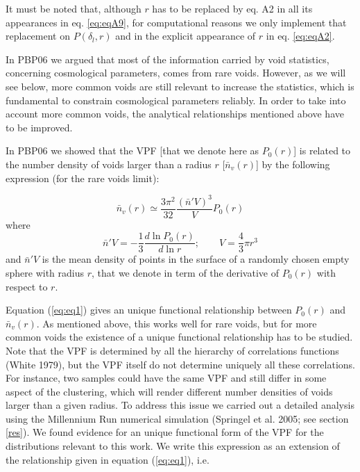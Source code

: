   
It must be noted that, although $r$ has to be replaced by eq. A2 in all its appearances in eq. \ref{eq:eqA9}, for computational reasons we only implement 
that replacement on $P(\delta_l,r)$ and in the explicit appearance of $r$ in eq. \ref{eq:eqA2}.

In PBP06 we argued that most of the information carried by void statistics, concerning cosmological parameters, comes from rare voids.
However, as we will see below, more common voids are still relevant to increase the statistics, which is fundamental to constrain cosmological parameters reliably. 
In order to take into account more common voids, the analytical relationships mentioned above have to be improved.

In PBP06 we showed that the VPF [that we denote here as $P_{0}(r)$] is related to the number density of voids larger 
than a radius $r$ [$\bar{n}_{v}(r)$] by the following expression (for the rare voids limit):

\begin{equation}
\bar{n}_{v}(r) \simeq \frac{3\pi^2}{32}\frac{(\bar{n}'V)^3}{V}P_{0}(r) \label{eq:eq1}
\end{equation}
where
\begin{equation}
\bar{n}'V=-\frac{1}{3}\frac{d\ln P_{0}(r)}{d\ln r} ;\qquad V=\frac{4}{3}\pi r^3   \label{eq:eq2} %
\end{equation}
and $\bar{n}'V$ is the mean density of points in the surface of a randomly chosen empty sphere with radius $r$, that we denote in term of 
the derivative of $P_{0}(r)$ with respect to $r$.

Equation (\ref{eq:eq1}) gives an unique functional relationship between $P_{0}(r)$ and $\bar{n}_{v}(r)$. As mentioned above, this works well for 
rare voids, but for more common voids the existence of a unique functional relationship has to be studied. Note that the VPF is determined by all the 
hierarchy of correlations functions (White 1979), but the VPF itself do not determine uniquely all these correlations. For instance, two samples could have 
the same VPF and still differ in some aspect of the clustering, which will render different number densities of voids larger than a given radius.
To address this issue we carried out a detailed analysis using the Millennium Run numerical simulation (Springel et al. 2005; see section \ref{res}). We found evidence for an unique 
functional form of the VPF for the distributions relevant to this work. We write this expression as an extension of the relationship given in equation (\ref{eq:eq1}), i.e.

